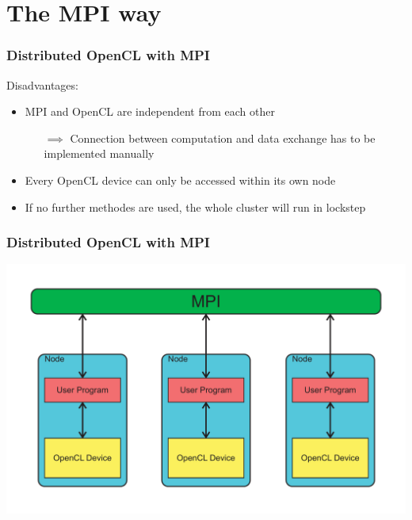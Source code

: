 \documentclass{beamer}
\begin{document}
\section{The MPI way}

\begin{frame}
    \frametitle{Distributed OpenCL with MPI}
    Disadvantages:
    \begin{itemize}
        \item MPI and OpenCL are independent from each other
        \begin{itemize}
            \item[$\implies$] Connection between computation and data exchange
                              has to be implemented manually
        \end{itemize}
        \item Every OpenCL device can only be accessed within its own node
        \item If no further methodes are used, the whole cluster will run in lockstep
    \end{itemize}
\end{frame}

\begin{frame}
    \frametitle{Distributed OpenCL with MPI}
    \begin{center}
        \includegraphics[width=\textwidth]{../2014-09-25_gputalk/mpi_opencl.pdf}
    \end{center}
\end{frame}
\end{document}
